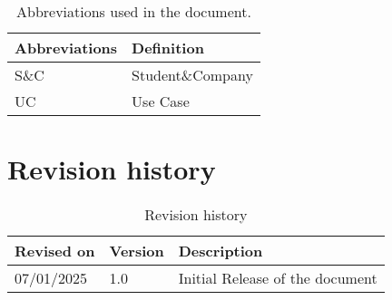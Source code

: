\begin{table}[H]
    \begin{center}
        \begin{tabular}{ |l|l| }
            \hline
            \textbf{Abbreviations} & \textbf{Definition}
            \\
            \hline
            S\&C    & Student\&Company \\
            \hline
            UC      & Use Case \\
            \hline
         \end{tabular}
        \caption{Abbreviations used in the document.}
        \label{tab:Abbreviations}%
    \end{center}
\end{table}

\section{Revision history}
\label{sec:revision_history}%
\label{sec:definition_acronyms_abbreviations}%
\begin{table}[H]
    \begin{center}
        \begin{tabular}{ |l|l|l|}
            \hline
            \textbf{Revised on} & \textbf{Version}   & \textbf{Description}                           \\
            \hline
            07/01/2025            & 1.0   &   Initial Release of the document  \\
            \hline
         \end{tabular}
         \caption{Revision history}
        \label{tab:acronyms}%
    \end{center}
\end{table}

\setcounter{bib}{1}
\newcommand{\cbib} {\thebib\stepcounter{bib}}

